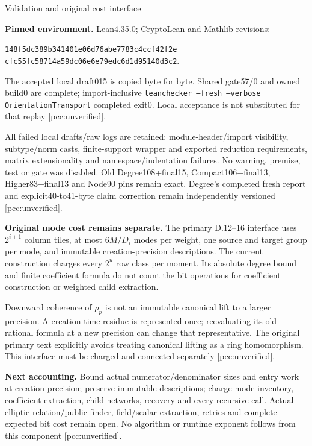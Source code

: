 \documentclass[10pt]{article}
\begin{document}
\newpage
\begin{center}{\Large Validation and original cost interface}\end{center}
\textbf{Pinned environment.} Lean4.35.0; CryptoLean and Mathlib revisions:
\begin{center}\small
\texttt{148f5dc389b341401e06d76abe7783c4ccf42f2e}\\
\texttt{cfc55fc58714a59dc06e6e79edc6d1d95140d3c2}.
\end{center}
The accepted local draft015 is copied byte for byte. Shared gate57/0 and
owned build0 are complete; import-inclusive
\texttt{leanchecker --fresh --verbose OrientationTransport} completed exit0.
Local acceptance is not substituted for that replay [pcc:unverified].

All failed local drafts/raw logs are retained: module-header/import visibility,
subtype/norm casts, finite-support wrapper and exported reduction requirements,
matrix extensionality and namespace/indentation failures. No warning, premise,
test or gate was disabled. Old Degree108+final15, Compact106+final13,
Higher83+final13 and Node90 pins remain exact. Degree's completed fresh report
and explicit40-to41-byte claim correction remain independently versioned
[pcc:unverified].

\textbf{Original mode cost remains separate.} The primary D.12--16 interface
uses $2^{i+1}$ column tiles, at most $6M/D_i$ modes per weight, one source
and target group per mode, and immutable creation-precision descriptions.
The current construction charges every $2^u$ row class per moment. Its
absolute degree bound and finite coefficient formula do not count the bit
operations for coefficient construction or weighted child extraction.

Downward coherence of $\rho_p$ is not an immutable canonical lift to a larger
precision. A creation-time residue is represented once; reevaluating its old
rational formula at a new precision can change that representative. The
original primary text explicitly avoids treating canonical lifting as a
ring homomorphism. This interface must be charged and connected separately
[pcc:unverified].

\textbf{Next accounting.} Bound actual numerator/denominator sizes and entry
work at creation precision; preserve immutable descriptions; charge mode
inventory, coefficient extraction, child networks, recovery and every
recursive call. Actual elliptic relation/public finder, field/scalar
extraction, retries and complete expected bit cost remain open. No algorithm
or runtime exponent follows from this component [pcc:unverified].
\end{document}
